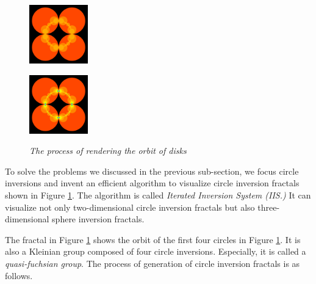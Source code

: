 \begin{figure}[htbp]
 \begin{minipage}[t]{0.16\hsize}
  \center
  \includegraphics[width=1in, height=1in, keepaspectratio]{./img/preparation/orbit/level2c.pdf}
  \subcaption{}
  \label{fig:level2}
 \end{minipage}
 \begin{minipage}[t]{0.16\hsize}
  \center
  \includegraphics[width=1in, height=1in, keepaspectratio]{img/preparation/orbit/levelMaxc.pdf}
  \subcaption{}
  \label{fig:levelMax}
 \end{minipage}
 \caption{\textit{The process of rendering the orbit of disks}}
 \label{fig:schottkyProcess}
\end{figure}

\noindent To solve the problems we discussed in the previous sub-section,
we focus circle inversions and invent an efficient algorithm to
visualize circle inversion fractals shown in Figure \ref{fig:schottkyProcess}.
The algorithm is called \textit{Iterated Inversion System (IIS.)}
It can visualize not only two-dimensional circle inversion fractals but
also three-dimensional sphere inversion fractals.

The fractal in Figure \ref{fig:schottkyProcess} shows the orbit of the first
four circles in Figure \ref{fig:schottkyProcess}. %
It is also a Kleinian group composed of four circle inversions.
Especially, it is called a \textit{quasi-fuchsian group}.
The process of generation of circle inversion fractals is
as follows.

